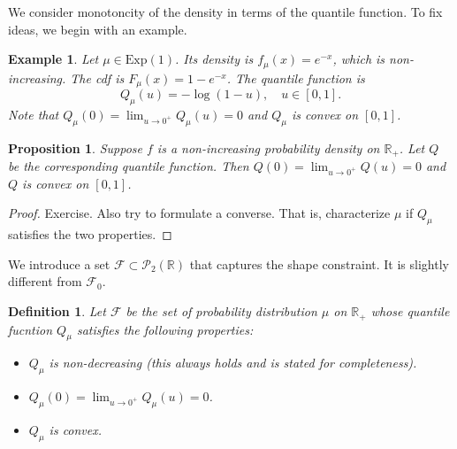 \documentclass{article}
\newcommand{\bR}{\mathbb{R}}
\newcommand{\cF}{\mathcal{F}}
\newcommand{\cP}{\mathcal{P}}
\numberwithin{equation}{section}
\newtheorem{proposition}[theorem]{Proposition}
\newtheorem{definition}[theorem]{Definition}
\newtheorem{example}{Example}
\begin{document}
\medskip

We consider monotoncity of the density in terms of the quantile function. To fix ideas, we begin with an example.

\begin{example}
Let $\mu \in \mathrm{Exp}(1)$. Its density is $f_{\mu}(x) = e^{-x}$, which is non-increasing. The cdf is $F_{\mu}(x) = 1 - e^{-x}$. The quantile function is
\[
Q_{\mu}(u) = -\log(1 - u), \quad u \in [0, 1].
\]
Note that $Q_{\mu}(0) = \lim_{u \rightarrow 0^+} Q_{\mu}(u) = 0$ and $Q_{\mu}$ is convex on $[0, 1]$.
\end{example}

\begin{proposition}
Suppose $f$ is a non-increasing probability density on $\bR_+$. Let $Q$ be the corresponding quantile function. Then $Q(0) = \lim_{u \rightarrow 0^+} Q(u) = 0$ and $Q$ is convex on $[0, 1]$.
\end{proposition}
\begin{proof}
Exercise. Also try to formulate a converse. That is, characterize $\mu$ if $Q_{\mu}$ satisfies the two properties.
\end{proof}

We introduce a set $\cF \subset \cP_2(\bR)$ that captures the shape constraint. It is slightly different from $\cF_0$.

\begin{definition}
Let $\cF$ be the set of probability distribution $\mu$ on $\bR_+$ whose quantile fucntion $Q_{\mu}$ satisfies the following properties:
\begin{itemize}
\item[(i)] $Q_{\mu}$ is non-decreasing (this always holds and is stated for completeness).
\item[(ii)] $Q_{\mu}(0) = \lim_{u \rightarrow 0^+} Q_{\mu}(u) = 0$.
\item[(iii)] $Q_{\mu}$ is convex.
\end{itemize}
\end{definition}
\end{document}
